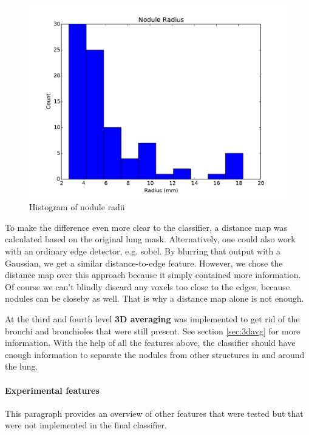 \begin{figure}[ht]
\begin{center}
  \includegraphics[width=\linewidth]{img/MaxNoduleRadii.pdf}
  \caption{Histogram of nodule radii}
  \label{fig:radii}
\end{center}
\end{figure}

To make the difference even more clear to the classifier, a distance map was
calculated based on the original lung mask. Alternatively, one could also work
with an ordinary edge detector, e.g. sobel. By blurring that output with a
Gaussian, we get a similar distance-to-edge feature. However, we chose the
distance map over this approach because it simply contained more information. Of
course we can't blindly discard any voxels too close to the edges, because
nodules can be closeby as well. That is why a distance map alone is not enough.

At the third and fourth level \textbf{3D averaging} was implemented to get rid
of the bronchi and bronchioles that were still present. See section
\ref{sec:3davg} for more information. With the help of all the features above,
the classifier should have enough information to separate the nodules from other
structures in and around the lung.

\paragraph{Experimental features}
This paragraph provides an overview of other features that were
tested but that were not implemented in the final classifier.

